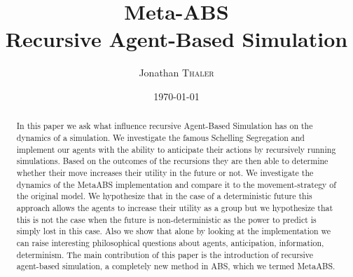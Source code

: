\documentclass[twocolumn]{article}
\title{Meta-ABS\\Recursive Agent-Based Simulation} %
\author{Jonathan \textsc{Thaler}} %
\date{\today} %
\begin{document}
\maketitle %

\begin{abstract}
In this paper we ask what influence recursive Agent-Based Simulation has on the dynamics of a simulation. We investigate the famous Schelling Segregation and implement our agents with the ability to anticipate their actions by recursively running simulations. Based on the outcomes of the recursions they are then able to determine whether their move increases their utility in the future or not.
We investigate the dynamics of the MetaABS implementation and compare it to the movement-strategy of the original model. We hypothesize that in the case of a deterministic future this approach allows the agents to increase their utility as a group but we hypothesize that this is not the case when the future is non-deterministic as the power to predict is simply lost in this case.
Also we show that alone by looking at the implementation we can raise interesting philosophical questions about agents, anticipation, information, determinism.
The main contribution of this paper is the introduction of recursive agent-based simulation, a completely new method in ABS, which we termed MetaABS.
\end{abstract}













\end{document}
